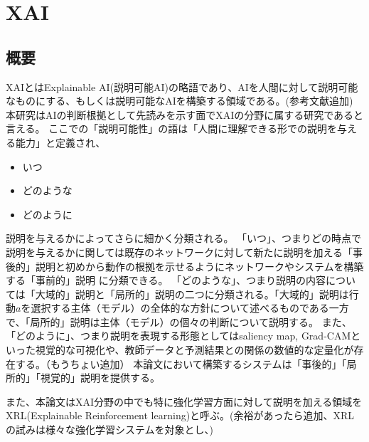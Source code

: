 \section{XAI}

\subsection{概要}
XAIとはExplainable AI(説明可能AI)の略語であり、AIを人間に対して説明可能なものにする、もしくは説明可能なAIを構築する領域である。(参考文献追加)
本研究はAIの判断根拠として先読みを示す面でXAIの分野に属する研究であると言える。
ここでの「説明可能性」の語は「人間に理解できる形での説明を与える能力」\cite{definition}と定義され、
\begin{itemize}
    \item いつ
    \item どのような
    \item どのように
\end{itemize}
説明を与えるかによってさらに細かく分類される。
「いつ」、つまりどの時点で説明を与えるかに関しては既存のネットワークに対して新たに説明を加える「事後的」説明と初めから動作の根拠を示せるようにネットワークやシステムを構築する「事前的」説明
に分類できる\cite{definition}。
「どのような」、つまり説明の内容については「大域的」説明と「局所的」説明の二つに分類される。「大域的」説明は行動$a$を選択する主体（モデル）の全体的な方針について述べるものである一方で、「局所的」説明は主体（モデル）の個々の判断について説明する\cite{gl}。
また、「どのように」、つまり説明を表現する形態としてはsaliency map\cite{saliency}, Grad-CAM\cite{Grad-CAM}といった視覚的な可視化や、教師データと予測結果との関係の数値的な定量化\cite{定量}が存在する。（もうちょい追加）
本論文において構築するシステムは「事後的」「局所的」「視覚的」説明を提供する。

また、本論文はXAI分野の中でも特に強化学習方面に対して説明を加える領域をXRL(Explainable Reinforcement learning)と呼ぶ。(余裕があったら追加、XRLの試みは様々な強化学習システムを対象とし、)
